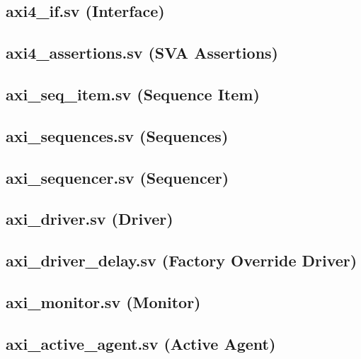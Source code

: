 \documentclass[10pt,a4paper]{article}
\begin{document}
\subsection{axi4\_if.sv (Interface)}


\subsection{axi4\_assertions.sv (SVA Assertions)}


\subsection{axi\_seq\_item.sv (Sequence Item)}


\subsection{axi\_sequences.sv (Sequences)}


\subsection{axi\_sequencer.sv (Sequencer)}


\subsection{axi\_driver.sv (Driver)}


\subsection{axi\_driver\_delay.sv (Factory Override Driver)}


\subsection{axi\_monitor.sv (Monitor)}


\subsection{axi\_active\_agent.sv (Active Agent)}

\end{document}
